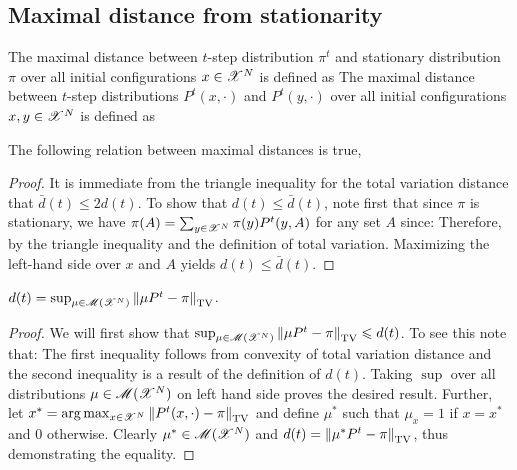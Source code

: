 \documentclass[letterpaper,english,10pt]{article}
\begin{document}
\subsection{Maximal distance from stationarity}
\begin{defn}
The maximal distance between $t$-step distribution $\pi^t$ and stationary distribution $\pi$ over all initial configurations $x \in\mathscr{X}^N$ is defined as 
The maximal distance between $t$-step distributions $P^t(x, \cdot)$ and $P^t(y, \cdot)$ over all initial configurations $x, y \in\mathscr{X}^N$ is defined as 
\end{defn}
\begin{lem} 
\label{lemma:d_bar_d_relation}
The following relation between maximal distances is true, 
\end{lem}
\begin{proof} 
It is immediate from the triangle inequality for the total variation distance that $\bar{d}(t) \le 2d(t)$.
To show that $d(t) \le \bar{d}(t)$, note first that since $\pi$ is stationary, 
we have $\pi(A) = \sum_{y \in \mathscr{X}^N}\pi(y)P^t(y, A)$ for any set $A$ since:
Therefore, 
by the triangle inequality and the definition of total variation. 
Maximizing the left-hand side over $x$ and $A$ yields $d(t) \le \bar{d}(t)$.  
\end{proof}
\begin{prop}
$d(t) = \sup_{\mu \in \mathscr{M}(\mathscr{X}^N)}\left\lVert\mu P^t - \pi\right\rVert_{\text{TV}}$.
\end{prop}
\begin{proof}
We will first show that $\sup_{\mu \in \mathscr{M}(\mathscr{X}^N)}\left\lVert\mu P^t - \pi\right\rVert_{\text{TV}} \leqslant d(t)$. To see this note that:
The first inequality follows from convexity of total variation distance and the second inequality is a result of the definition of $d(t)$. Taking $\sup$ over all distributions $\mu \in \mathscr{M}(\mathscr{X}^N)$ on left hand side proves the desired result.
Further, let $x^\ast = \mathrm{arg}\max_{x \in \mathscr{X}^N} \left\lVert P^t(x, \cdot) - \pi\right\rVert_{\text{TV}}$ and define $\mu^\ast$ such that $\mu_x=1$ if $x = x^\ast$ and $0$ otherwise. Clearly $\mu^\ast \in \mathscr{M}(\mathscr{X}^N)$ and $d(t) = \left\lVert\mu^\ast P^t - \pi\right\rVert_{\text{TV}}$, thus demonstrating the equality.
\end{proof}
\end{document}
